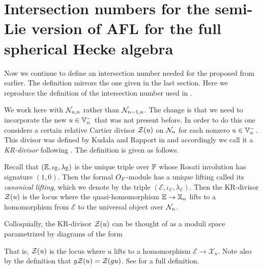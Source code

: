 \section{Intersection numbers for the semi-Lie version of AFL for the full spherical Hecke algebra}
Now we continue to define an intersection number needed for the proposed
 from earlier.
The definition mirrors the one given in the last section.
Here we reproduce the definition of the intersection number used in .

We work here with $\mathcal N_{n,n}$ rather than $\mathcal N_{n-1,n}$.
The change is that we need to incorporate the new $u \in \mathbb V_n^-$ that was not present before.
In order to do this one considers a certain relative Cartier divisor $\mathcal Z(u)$
on $\mathcal N_n$ for each nonzero $u \in \mathbb V_n^-$.
This divisor was defined by Kudala and Rapport in \cite{ref:KR}
and accordingly we call it a \emph{KR-divisor} following \cite[\S4.3]{ref:survey}.
The definition is given as follows.
\begin{definition}
  Recall that $(\mathbb E, \iota_\mathbb E, \lambda_\mathbb E)$ is the unique triple over $\mathbb F$
  whose Rosati involution has signature $(1,0)$.
  Then the formal $O_F$-module has a unique lifting called its \emph{canonical lifting},
  which we denote by the triple $(\mathcal{E}, \iota_{\mathcal{E}}, \lambda_{\mathcal E})$.
  Then the KR-divisor $\mathcal Z(u)$ is the locus where the quasi-homomorphism
  $\mathbb E \to \mathbb X_n$ lifts to a homomorphism from $\mathcal{E}$ to the universal object over $\mathcal N_n$.
\end{definition}
Colloquially, the KR-divisor $\mathcal Z(u)$ can be thought of as a
moduli space parametrized by diagrams of the form
\begin{center}
\end{center}
That is, $\mathcal Z(u)$ is the locus where $u$ lifts to a homomorphism $\mathcal{E} \to \mathcal{X}_n$.
Note also by the definition that $g \mathcal Z(u) = \mathcal Z (gu)$.
See \cite{ref:KR} for a full definition.

